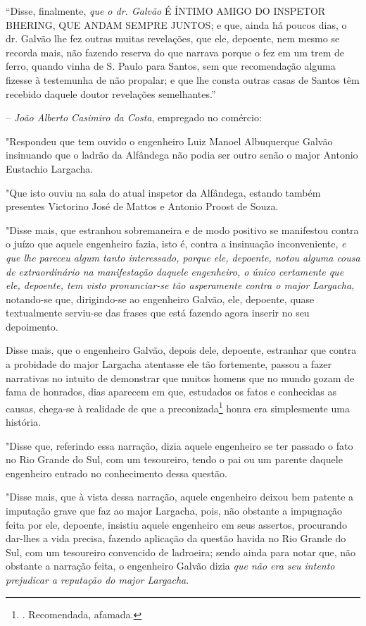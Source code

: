 ``Disse, finalmente, \emph{que o dr. Galvão} É ÍNTIMO AMIGO DO INSPETOR
BHERING, QUE ANDAM SEMPRE JUNTOS; e que, ainda há poucos dias, o dr.
Galvão lhe fez outras muitas revelações, que ele, depoente, nem mesmo se
recorda mais, não fazendo reserva do que narrava porque o fez em um trem
de ferro, quando vinha de S. Paulo para Santos, sem que recomendação
alguma fizesse à testemunha de não propalar; e que lhe consta outras
casas de Santos têm recebido daquele doutor revelações semelhantes.''

-- \emph{João Alberto Casimiro da Costa}, empregado no comércio:

"Respondeu que tem ouvido o engenheiro Luiz Manoel Albuquerque Galvão
insinuando que o ladrão da Alfândega não podia ser outro senão o major
Antonio Eustachio Largacha.

"Que isto ouviu na sala do atual inspetor da Alfândega, estando também
presentes Victorino José de Mattos e Antonio Proost de Souza.

"Disse mais, que estranhou sobremaneira e de modo positivo se manifestou
contra o juízo que aquele engenheiro fazia, isto é, contra a insinuação
inconveniente, \emph{e que lhe pareceu algum tanto interessado, porque
ele, depoente, notou alguma cousa de extraordinário na manifestação
daquele engenheiro, o único certamente que ele, depoente, tem visto
pronunciar-se tão asperamente contra o major Largacha}, notando-se que,
dirigindo-se ao engenheiro Galvão, ele, depoente, quase textualmente
serviu-se das frases que está fazendo agora inserir no seu depoimento.

Disse mais, que o engenheiro Galvão, depois dele, depoente, estranhar
que contra a probidade do major Largacha atentasse ele tão fortemente,
passou a fazer narrativas no intuito de demonstrar que muitos homens que
no mundo gozam de fama de honrados, dias aparecem em que, estudados os
fatos e conhecidas as causas, chega-se à realidade de que a
preconizada\footnote{. Recomendada, afamada.} honra era simplesmente uma
história.

"Disse que, referindo essa narração, dizia aquele engenheiro se ter
passado o fato no Rio Grande do Sul, com um tesoureiro, tendo o pai ou
um parente daquele engenheiro entrado no conhecimento dessa questão.

"Disse mais, que à vista dessa narração, aquele engenheiro deixou bem
patente a imputação grave que faz ao major Largacha, pois, não obstante
a impugnação feita por ele, depoente, insistiu aquele engenheiro em seus
assertos, procurando dar-lhes a vida precisa, fazendo aplicação da
questão havida no Rio Grande do Sul, com um tesoureiro convencido de
ladroeira; sendo ainda para notar que, não obstante a narração feita, o
engenheiro Galvão dizia \emph{que não era seu intento prejudicar a
reputação do major Largacha}.

